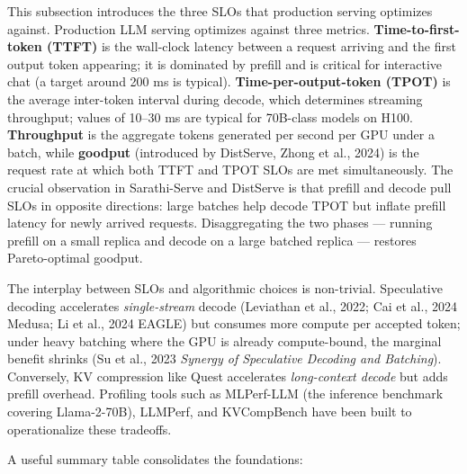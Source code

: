 \documentclass{article}
\begin{document}
This subsection introduces the three SLOs that production serving optimizes against. Production LLM serving optimizes against three metrics. \textbf{Time-to-first-token (TTFT)} is the wall-clock latency between a request arriving and the first output token appearing; it is dominated by prefill and is critical for interactive chat (a target around 200 ms is typical). \textbf{Time-per-output-token (TPOT)} is the average inter-token interval during decode, which determines streaming throughput; values of 10--30 ms are typical for 70B-class models on H100. \textbf{Throughput} is the aggregate tokens generated per second per GPU under a batch, while \textbf{goodput} (introduced by DistServe, Zhong et al., 2024) is the request rate at which both TTFT and TPOT SLOs are met simultaneously. The crucial observation in Sarathi-Serve \citep{agrawal20242024} and DistServe is that prefill and decode pull SLOs in opposite directions: large batches help decode TPOT but inflate prefill latency for newly arrived requests. Disaggregating the two phases --- running prefill on a small replica and decode on a large batched replica --- restores Pareto-optimal goodput.

The interplay between SLOs and algorithmic choices is non-trivial. Speculative decoding accelerates \emph{single-stream} decode (Leviathan et al., 2022; Cai et al., 2024 Medusa; Li et al., 2024 EAGLE) but consumes more compute per accepted token; under heavy batching where the GPU is already compute-bound, the marginal benefit shrinks (Su et al., 2023 \emph{Synergy of Speculative Decoding and Batching}). Conversely, KV compression like Quest \citep{tang20242024} accelerates \emph{long-context decode} but adds prefill overhead. Profiling tools such as MLPerf-LLM (the inference benchmark covering Llama-2-70B), LLMPerf, and KVCompBench have been built to operationalize these tradeoffs.

A useful summary table consolidates the foundations:
\end{document}
